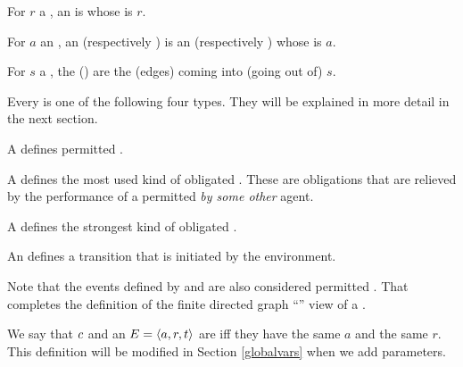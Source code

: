 \documentclass[12pt]{article}
\begin{document}
\begin{LPPI}
\item For $r$ a \Role, an  is \nameforaedge whose \Role is $r$.
\item For $a$ an \Action, an  (respectively ) is an \Event (respectively \actionrule) whose \Action is $a$.
\item For $s$ a \State, the  () are the \nameforedges (edges) coming into (going out of) $s$.
\end{LPPI}
Every \actionrule is one of the following four types. They will be explained in more detail in the next section.
\begin{LPPI}
\item A  defines permitted \Events.
\item A  defines the most used kind of obligated \Events. These are obligations that are relieved by the performance of a permitted {\Event} {\it by some other} agent.
\item A  defines the strongest kind of obligated \Events.
\item An  defines a transition that is initiated by the environment.
\end{LPPI}
Note that the events defined by \rmustnarules and \mustnarules are also considered permitted \Events. That completes the definition of the finite directed graph ``\Map'' view of a \Contract.

We say that \nameforaedge $c$ and an \Event $E = \langle a,r,t\rangle$ are  iff they have the same \Action $a$ and the same \Role $r$. This definition will be modified in Section \ref{globalvars} when we add \Event parameters. 
\medskip



\end{document}
